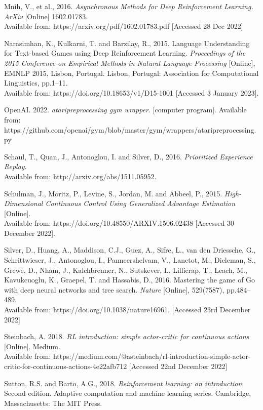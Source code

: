 \documentclass{article}
\begin{document}
Mnih, V., et al., 2016. \emph{Asynchronous Methods for Deep Reinforcement Learning. ArXiv} [Online] 1602.01783. \\
Available from: https://arxiv.org/pdf/1602.01783.pdf [Accessed 28 Dec 2022]

Narasimhan, K., Kulkarni, T. and Barzilay, R., 2015. Language Understanding for Text-based Games using Deep Reinforcement Learning. \emph{Proceedings of the 2015 Conference on Empirical Methods in Natural Language Processing} [Online], EMNLP 2015, Lisbon, Portugal. Lisbon, Portugal: Association for Computational Linguistics, pp.1–11. \\
Available from: https://doi.org/10.18653/v1/D15-1001 [Accessed 3 January 2023].

OpenAI. 2022. \emph{ataripreprocessing gym wrapper}. [computer program]. Available from: https://github.com/openai/gym/blob/master/gym/wrappers/ataripreprocessing.py

Schaul, T., Quan, J., Antonoglou, I. and Silver, D., 2016. \emph{Prioritized Experience Replay}. \\
Available from: http://arxiv.org/abs/1511.05952.

Schulman, J., Moritz, P., Levine, S., Jordan, M. and Abbeel, P., 2015. \emph{High-Dimensional Continuous Control Using Generalized Advantage Estimation}  [Online]. \\
Available from: https://doi.org/10.48550/ARXIV.1506.02438 [Accessed 30 December 2022].

Silver, D., Huang, A., Maddison, C.J., Guez, A., Sifre, L., van den Driessche, G., Schrittwieser, J., Antonoglou, I., Panneershelvam, V., Lanctot, M., Dieleman, S., Grewe, D., Nham, J., Kalchbrenner, N., Sutskever, I., Lillicrap, T., Leach, M., Kavukcuoglu, K., Graepel, T. and Hassabis, D., 2016. Mastering the game of Go with deep neural networks and tree search. \emph{Nature} [Online], 529(7587), pp.484–489. \\
Available from: https://doi.org/10.1038/nature16961. [Accessed 23rd December 2022]

Steinbach, A. 2018. \emph{RL introduction: simple actor-critic for continuous actions} [Online]. Medium. \\
Available from: https://medium.com/@asteinbach/rl-introduction-simple-actor-critic-for-continuous-actions-4e22afb712 [Accessed 22nd December 2022]

Sutton, R.S. and Barto, A.G., 2018. \emph{Reinforcement learning: an introduction}. Second edition. Adaptive computation and machine learning series. Cambridge, Massachusetts: The MIT Press.
\end{document}
